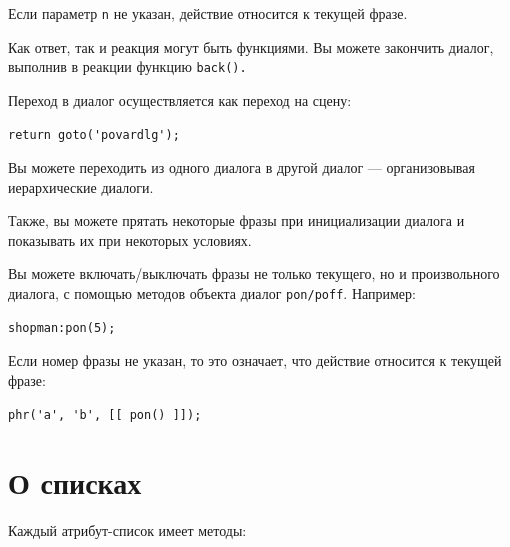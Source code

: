\documentclass[a4paper,12pt]{article}
\begin{document}
Если параметр \verb/n/ не указан, действие относится к текущей фразе.

Как ответ, так и реакция могут быть функциями. Вы можете закончить диалог, выполнив в реакции функцию \verb/back()./

Переход в диалог осуществляется как переход на сцену:

\begin{verbatim}
return goto('povardlg');
\end{verbatim}

Вы можете переходить из одного диалога в другой диалог --- организовывая иерархические диалоги.

Также, вы можете прятать некоторые фразы при инициализации диалога и показывать их при некоторых условиях.

Вы можете включать/выключать фразы не только текущего, но и произвольного диалога, с помощью методов объекта диалог \verb,pon/poff,. Например:

\begin{verbatim}
shopman:pon(5);
\end{verbatim}

Если номер фразы не указан, то это означает, что действие относится к текущей фразе:

\begin{verbatim}
phr('a', 'b', [[ pon() ]]);
\end{verbatim}

\section{О списках}

Каждый атрибут-список имеет методы:
\end{document}
